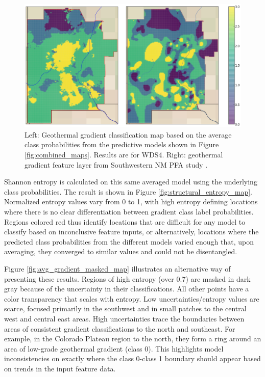 \begin{figure}[!htp]
\centering
\includegraphics[width=\textwidth]{templates/images/Figure-Average_Gradient_Map_Joint.png}
\caption[Probability-averaged prediction map]{Left: Geothermal gradient classification map based on the average class probabilities from the predictive models shown in Figure \ref{fig:combined_maps}. Results are for WDS4. Right: geothermal gradient feature layer from Southwestern NM PFA study \protect\citep{bielicki_hydrogeolgic_2015}.}
\label{fig:avg_final_map}
\end{figure}

Shannon entropy is calculated on this same averaged model using the underlying class probabilities. The result is shown in Figure \ref{fig:structural_entropy_map}. Normalized entropy values vary from 0 to 1, with high entropy defining locations where there is no clear differentiation between gradient class label probabilities. Regions colored red thus identify locations that are difficult for any model to classify based on inconclusive feature inputs, or alternatively, locations where the predicted class probabilities from the different models varied enough that, upon averaging, they converged to similar values and could not be disentangled.

Figure \ref{fig:avg_gradient_masked_map} illustrates an alternative way of presenting these results. Regions of high entropy (over 0.7) are masked in dark gray because of the uncertainty in their classifications. All other points have a color transparency that scales with entropy. Low uncertainties/entropy values are scarce, focused primarily in the southwest and in small patches to the central west and central east areas. High uncertainties trace the boundaries between areas of consistent gradient classifications to the north and southeast. For example, in the Colorado Plateau region to the north, they form a ring around an area of low-grade geothermal gradient (class 0). This highlights model inconsistencies on exactly where the class 0-class 1 boundary should appear based on trends in the input feature data.


